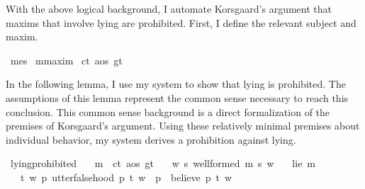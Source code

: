 \begin{isabellebody}
\begin{isamarkuptext}
With the above logical background, I automate Korsgaard's argument that maxims that involve
lying are prohibited. First, I define the relevant subject and maxim.%
\end{isamarkuptext}\isamarkuptrue%
\isamarkupfalse%
\ me{\isacharcolon}{\isacharcolon}s\isanewline
%
\isanewline
{}\isamarkupfalse%
\ m{\isacharcolon}{\isacharcolon}maxim\isanewline
%
\isanewline
{}\isamarkupfalse%
\ c{\isacharcolon}{\isacharcolon}t\ a{\isacharcolon}{\isacharcolon}os\ g{\isacharcolon}{\isacharcolon}t\isanewline
%
%
\begin{isamarkuptext}%
In the following lemma, I use my system to show that lying is prohibited. The assumptions of 
this lemma represent the common sense necessary to reach this conclusion. This
common sense background is a direct formalization of the premises of Korsgaard's argument. Using these
relatively minimal premises about individual behavior, my system derives a prohibition against lying.%
\end{isamarkuptext}\isamarkuptrue%
\isamarkupfalse%
\ lying{\isacharunderscore}prohibited{\isacharcolon}\isanewline
\ \ \ {\isachardoublequoteopen}m\ {\isasymequiv}\ {\isacharparenleft}c{\isacharcolon}{\isacharcolon}t{\isacharcomma}\ a{\isacharcolon}{\isacharcolon}os{\isacharcomma}\ g{\isacharcolon}{\isacharcolon}t{\isacharparenright}{\isachardoublequoteclose}\isanewline
\ \ \ {\isachardoublequoteopen}{\isasymforall}w{\isachardot}\ {\isasymforall}s{\isachardot}\ well{\isacharunderscore}formed\ m\ s\ w{\isachardoublequoteclose}\isanewline
%
\isanewline
\ \ \ {\isachardoublequoteopen}lie\ m{\isachardoublequoteclose}\isanewline
%
\isanewline
\ \ \ {\isachardoublequoteopen}{\isasymforall}t\ w{\isachardot}\ {\isacharparenleft}{\isacharparenleft}{\isasymforall}p{\isachardot}\ utter{\isacharunderscore}falsehood\ p\ t\ w{\isacharparenright}\ {\isasymlongrightarrow}\ {\isacharparenleft}{\isasymforall}p{\isachardot}\ \isactrlbold {\isasymnot}\ {\isacharparenleft}believe\ p\ t{\isacharparenright}\ w{\isacharparenright}{\isacharparenright}{\isachardoublequoteclose}\isanewline

\end{isabellebody}
